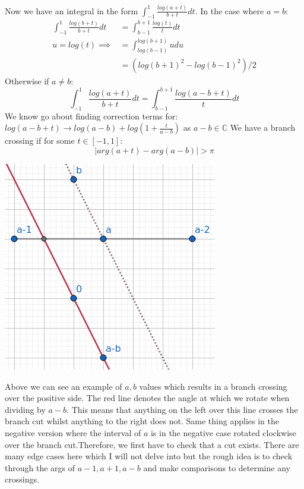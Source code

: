 \documentclass{article}
\begin{document}
Now we have an integral in the form $\int_{-1}^1\frac{log(a+t)}{b+t}dt$.
In the case where $a=b$:
\begin{align}
    \int_{-1}^1\frac{log(b+t)}{b+t}dt&=\int_{b-1}^{b+1}\frac{log(t)}{t}dt\\
    u = log(t) \implies &= \int_{log(b-1)}^{log(b+1)}udu\\
    &=(log(b+1)^2-log(b-1)^2)/2
\end{align}
Otherwise if $a\neq b$:
$$\int_{-1}^1\frac{log(a+t)}{b+t}dt=\int_{b-1}^{b+1}\frac{log(a-b+t)}{t}dt$$
We know go about finding correction terms for: $log(a-b+t)\rightarrow log(a-b)+log(1+\frac{t}{a-b})$ as $a-b\in\mathbb{C}$
We have a branch crossing if for some $t\in[-1,1]$:
$$|arg(a+t)-arg(a-b)|>\pi$$
\begin{center}\includegraphics[width=\textwidth/2]{s00}\end{center}
Above we can see an example of $a,b$ values which results in a branch crossing over the positive side.
The red line denotes the angle at which we rotate when dividing by $a-b$.
This means that anything on the left over this line crosses the branch cut whilst anything to the right does not.
Same thing applies in the negative version where the interval of $a$ is in the negative case rotated clockwise over the branch cut.Therefore, we first have to check that a cut exists.
There are many edge cases here which I will not delve into but the rough idea is to check through the args of $a-1,a+1,a-b$ and make comparisons to determine any crossings.
\end{document}
